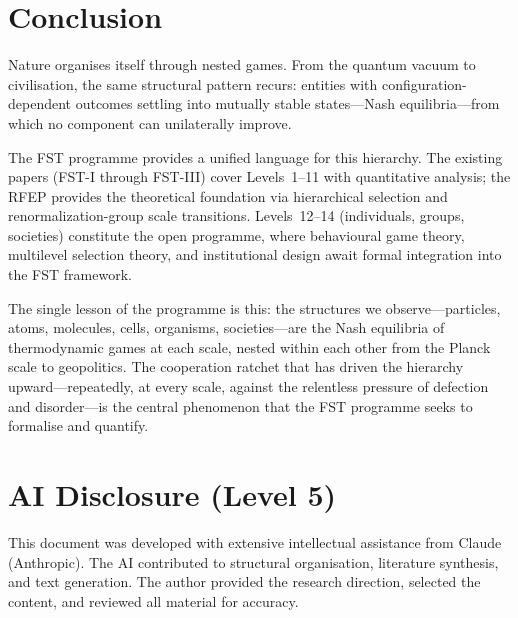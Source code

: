 \documentclass[12pt,a4paper]{article}
\theoremstyle{remark}
\begin{document}
\section{Conclusion}
\label{sec:conclusion}

Nature organises itself through nested games. From the quantum vacuum to civilisation, the same structural pattern recurs: entities with configuration-dependent outcomes settling into mutually stable states---Nash equilibria---from which no component can unilaterally improve.

The FST programme provides a unified language for this hierarchy. The existing papers (FST-I through FST-III) cover Levels~1--11 with quantitative analysis; the RFEP provides the theoretical foundation via hierarchical selection and renormalization-group scale transitions. Levels~12--14 (individuals, groups, societies) constitute the open programme, where behavioural game theory, multilevel selection theory, and institutional design await formal integration into the FST framework.

The single lesson of the programme is this: the structures we observe---particles, atoms, molecules, cells, organisms, societies---are the Nash equilibria of thermodynamic games at each scale, nested within each other from the Planck scale to geopolitics. The cooperation ratchet that has driven the hierarchy upward---repeatedly, at every scale, against the relentless pressure of defection and disorder---is the central phenomenon that the FST programme seeks to formalise and quantify.


\section*{AI Disclosure (Level 5)}

This document was developed with extensive intellectual assistance from Claude (Anthropic). The AI contributed to structural organisation, literature synthesis, and text generation. The author provided the research direction, selected the content, and reviewed all material for accuracy.
\end{document}
